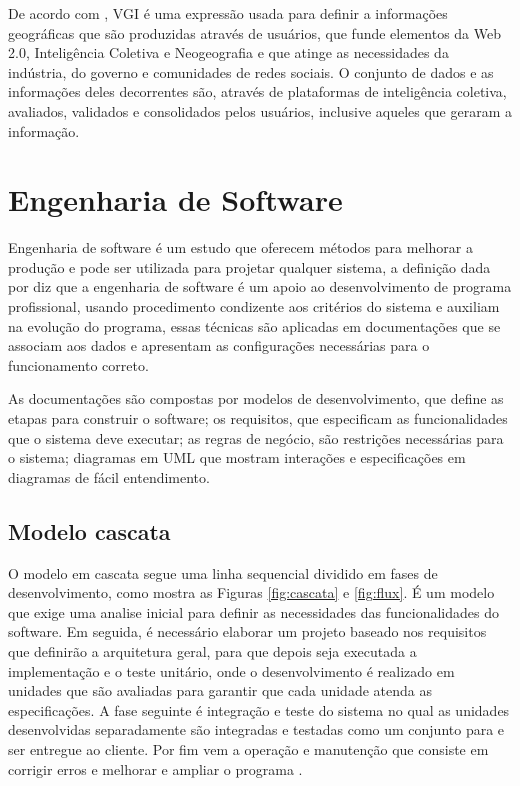     De acordo com , VGI é uma expressão usada para definir a informações geográficas que são produzidas através de usuários, que funde elementos da Web 2.0, Inteligência Coletiva e Neogeografia e que atinge as necessidades da indústria, do governo e comunidades de redes sociais. O conjunto de dados e as informações deles decorrentes são, através de plataformas de inteligência coletiva, avaliados, validados e consolidados pelos usuários, inclusive aqueles que geraram a informação.


\section{Engenharia de Software}
    Engenharia de software é um estudo que oferecem métodos para melhorar a produção e pode ser utilizada para projetar qualquer sistema, a definição dada por  diz que a engenharia de software é um apoio ao desenvolvimento de programa profissional, usando procedimento condizente aos critérios do sistema e auxiliam na evolução do programa, essas técnicas são aplicadas em documentações que se associam aos dados e apresentam as configurações necessárias para o funcionamento correto.
    
    As documentações são compostas por modelos de desenvolvimento, que define as etapas para construir o software; os requisitos, que especificam as funcionalidades que o  sistema deve executar; as regras de negócio, são restrições necessárias para o sistema; diagramas em UML que mostram interações e especificações em diagramas de fácil entendimento.


    \subsection{Modelo cascata}
        O modelo em cascata segue uma linha sequencial dividido em fases de desenvolvimento, como mostra as Figuras \ref{fig:cascata} e \ref{fig:flux}. É um modelo que exige uma analise inicial para definir as necessidades das funcionalidades do software. Em seguida, é necessário elaborar um projeto baseado nos requisitos que definirão a arquitetura geral, para que depois seja executada a implementação e o teste unitário, onde o desenvolvimento é realizado em unidades que são avaliadas para garantir que cada unidade atenda as especificações. A fase seguinte é integração e teste do sistema no qual as unidades desenvolvidas separadamente são integradas e testadas como um conjunto para e ser entregue ao cliente. Por fim vem a operação e manutenção que consiste em corrigir erros e melhorar e ampliar o programa \cite[p.~20]{ian_sommerville}.
    
